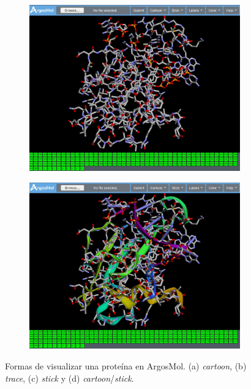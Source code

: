 \documentclass{article}
\begin{document}
\begin{figure}[H]
\begin{subfigure}{.5\textwidth}
		\caption{}
		\label{fig:sfig2}
	\end{subfigure}
	\begin{subfigure}{.5\textwidth}
		\centering
		\includegraphics[width=.99\linewidth]{img/argosmol/mol4}
		\caption{}
		\label{fig:sfig1}
	\end{subfigure}%
	\begin{subfigure}{.5\textwidth}
		\centering
		\includegraphics[width=.99\linewidth]{img/argosmol/mol5}
		\caption{}
		\label{fig:sfig2}
	\end{subfigure}
	\caption{Formas de visualizar una proteína en ArgosMol. (a) \textit{cartoon}, (b) \textit{trace}, (c) \textit{stick} y (d) \textit{cartoon}/\textit{stick}. }
	\label{fig:cartoon}
\end{figure}
\end{document}
